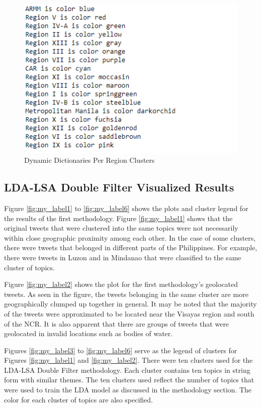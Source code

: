 \begin{figure}
    \centering
    \includegraphics[width=\textwidth, height=\textheight,keepaspectratio]{Method2Cluster.PNG}
    \caption{Dynamic Dictionaries Per Region Clusters}
    \label{fig:my_label9}
\end{figure}

\subsection{LDA-LSA Double Filter Visualized Results}
Figure \ref{fig:my_label1} to \ref{fig:my_label6} shows the plots and cluster legend for the results of the first methodology. Figure \ref{fig:my_label1} shows that the original tweets that were clustered into the same topics were not necessarily within close geographic proximity among each other. In the case of some clusters, there were tweets that belonged in different parts of the Philippines. For example, there were tweets in Luzon and in Mindanao that were classified to the same cluster of topics. 

Figure \ref{fig:my_label2} shows the plot for the first methodology's geolocated tweets. As seen in the figure, the tweets belonging in the same cluster are more geographically clumped up together in general. It may be noted that the majority of the tweets were approximated to be located near the Visayas region and south of the NCR. It is also apparent that there are groups of tweets that were geolocated in invalid locations such as bodies of water. 

Figures \ref{fig:my_label3} to \ref{fig:my_label6} serve as the legend of clusters for Figures \ref{fig:my_label1} and \ref{fig:my_label2}. There were ten clusters used for the LDA-LSA Double Filter methodology. Each cluster contains ten topics in string form with similar themes. The ten clusters used reflect the number of topics that were used to train the LDA model as discussed in the methodology section. The color for each cluster of topics are also specified. 


